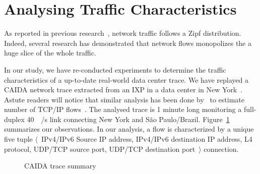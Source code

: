 \section{Analysing Traffic Characteristics}

As reported in previous research~\cite{Sarrar:2012}, network traffic follows a Zipf distribution.
Indeed, several research has demonstrated that network flows monopolizes the a huge slice of the whole traffic.

In our study, we have re-conducted experiments to determine the traffic characteristics of a up-to-date real-world data center trace.
We have replayed a CAIDA network trace extracted from an IXP in a data center in New York~\cite{caida:19}.
Astute readers will notice that similar analysis has been done by~\citeauthor{Spang:19} to estimate number of TCP/IP flows~\cite{Spang:19}.
The analysed trace is 1 minute long monitoring a full-duplex \SI{40}{\giga\bit/\second} link connecting New York and S\~ao Paulo/Brazil.
Figure~\ref{fig:traces} summarizes our observations. In our analysis, a flow is characterized by a unique five tuple $\langle$~IPv4/IPv6 Source IP address, IPv4/IPv6 destination IP address, L4 protocol, UDP/TCP source port, UDP/TCP destination port~$\rangle$ connection.

\begin{figure}[]
\centering
{}
\caption{CAIDA trace summary}
\label{fig:traces}
\end{figure}

